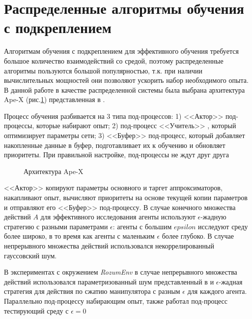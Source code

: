 \documentclass{mipt-thesis-bs}
\begin{document}
\section{Распределенные алгоритмы обучения с подкреплением}

Алгоритмам обучения с подкреплением для эффективного обучения требуется большое количество взаимодействий со средой, поэтому распределенные алгоритмы пользуются большой популярностью, т.к. при наличии вычислительных мощностей они позволяют ускорить набор необходимого опыта. В данной работе в качестве распределенной системы была выбрана архитектура Ape-X (рис.\ref{apex}) представленная в \cite{apex}.

Процесс обучения разбивается на 3 типа под-процессов: 1) <<Актор>> под-процессы, которые набирают опыт; 2) под-процесс <<Учитель>> , который оптимизирует параметры сети; 3) <<Буфер>> под-процесс, который добавляет накопленные данные в буфер, подготавливает их к обучению и обновляет приоритеты. При правильной настройке, под-процессы не ждут друг друга 

\begin{figure}[ht]
    \centering
    \vspace{-0.2cm}
    \caption{Архитектура Ape-X}
    \label{apex}
\end{figure}

<<Актор>> копируют параметры основного и таргет аппроксиматоров, накапливают опыт, вычисляют приоритеты на основе текущей копии параметров и отправляют его <<Буфер>> под-процессу. В случае конечного множества действий $A$ для эффективного исследования агенты используют $\epsilon$-жадную стратегию с разными параметрами $\epsilon$: агенты с большим $epsilon$ исследуют среду более широко, в то время как агенты с маленьким $\epsilon$ более глубоко. В случае непрерывного множества действий использовался некоррелированный гауссовский шум.

В экспериментах с окружением \textit{RozumEnv} в случае непрерывного множества действий использовался параметризованный шум представленный в \cite{noisy layers} и $\epsilon$-жадная стратегия для действия по сжатию манипулятора с разным $\epsilon$ для каждого агента. Параллельно под-процессу набирающим опыт, также работал под-процесс тестирующий среду с $\epsilon=0$
\end{document}
